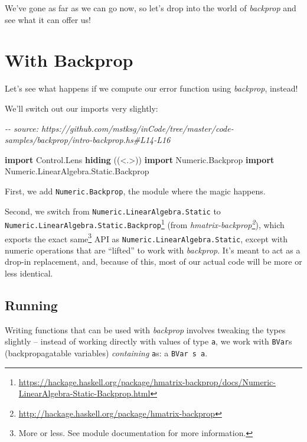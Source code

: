 \documentclass[]{article}
\newenvironment{Shaded}{}{}
\newcommand{\CommentTok}[1]{\textcolor[rgb]{0.38,0.63,0.69}{\textit{#1}}}
\newcommand{\DataTypeTok}[1]{\textcolor[rgb]{0.56,0.13,0.00}{#1}}
\newcommand{\KeywordTok}[1]{\textcolor[rgb]{0.00,0.44,0.13}{\textbf{#1}}}
\newcommand{\NormalTok}[1]{#1}
\renewcommand{\href}[2]{#2\footnote{\url{#1}}}
\begin{document}
We've gone as far as we can go now, so let's drop into the world of
\emph{backprop} and see what it can offer us!

\section{With Backprop}\label{with-backprop}

Let's see what happens if we compute our error function using \emph{backprop},
instead!

We'll switch out our imports very slightly:

\begin{Shaded}
\begin{Highlighting}[]
\CommentTok{{-}{-} source: https://github.com/mstksg/inCode/tree/master/code{-}samples/backprop/intro{-}backprop.hs\#L14{-}L16}

\KeywordTok{import}           \DataTypeTok{Control.Lens} \KeywordTok{hiding}\NormalTok{                   ((\textless{}.\textgreater{}))}
\KeywordTok{import}           \DataTypeTok{Numeric.Backprop}
\KeywordTok{import}           \DataTypeTok{Numeric.LinearAlgebra.Static.Backprop}
\end{Highlighting}
\end{Shaded}

First, we add \texttt{Numeric.Backprop}, the module where the magic happens.

Second, we switch from \texttt{Numeric.LinearAlgebra.Static} to
\href{https://hackage.haskell.org/package/hmatrix-backprop/docs/Numeric-LinearAlgebra-Static-Backprop.html}{\texttt{Numeric.LinearAlgebra.Static.Backprop}}
(from
\emph{\href{http://hackage.haskell.org/package/hmatrix-backprop}{hmatrix-backprop}}),
which exports the exact same\footnote{More or less. See module documentation for
  more information.} API as \texttt{Numeric.LinearAlgebra.Static}, except with
numeric operations that are ``lifted'' to work with \emph{backprop}. It's meant
to act as a drop-in replacement, and, because of this, most of our actual code
will be more or less identical.

\subsection{Running}\label{running-1}

Writing functions that can be used with \emph{backprop} involves tweaking the
types slightly -- instead of working directly with values of type \texttt{a}, we
work with \texttt{BVar}s (backpropagatable variables) \emph{containing}
\texttt{a}s: a \texttt{BVar\ s\ a}.
\end{document}
